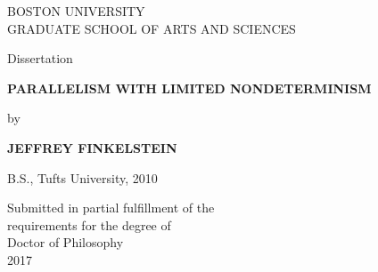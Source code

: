 \begin{titlepage}
  \begin{center}

    \uppercase{Boston University}\\
    \uppercase{Graduate School of Arts and Sciences}

    \vspace{8ex}

    Dissertation

    \vspace{10ex}

    \textbf{\uppercase{Parallelism with limited nondeterminism}}

    \vspace{10ex}

    by

    \vspace{8ex}

    \textbf{\uppercase{Jeffrey Finkelstein}}

    \vspace{5ex}
    B.S., Tufts University, 2010

    \vspace{22ex}

    Submitted in partial fulfillment of the\\
    requirements for the degree of\\
    Doctor of Philosophy\\
    2017
  \end{center}
\end{titlepage}
